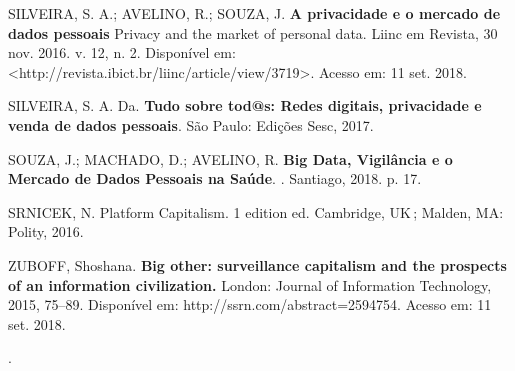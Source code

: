 SILVEIRA, S. A.; AVELINO, R.; SOUZA, J. \textbf{A privacidade e o
mercado de dados pessoais} \textbar{} Privacy and the market of personal
data. Liinc em Revista, 30 nov. 2016. v. 12, n. 2. Disponível em:
\textless{}http://revista.ibict.br/liinc/article/view/3719\textgreater{}.
Acesso em: 11 set. 2018.

SILVEIRA, S. A. Da. \textbf{Tudo sobre tod@s: Redes digitais,
privacidade e venda de dados pessoais}. São Paulo: Edições Sesc, 2017.

SOUZA, J.; MACHADO, D.; AVELINO, R. \textbf{Big Data, Vigilância e o
Mercado de Dados Pessoais na Saúde}. . Santiago, 2018. p. 17.

SRNICEK, N. Platform Capitalism. 1 edition ed. Cambridge, UK\,; Malden,
MA: Polity, 2016.

ZUBOFF, Shoshana. \textbf{Big other: surveillance capitalism and the
prospects of an information civilization.} London: Journal of
Information Technology, 2015, 75--89. Disponível em:
http://ssrn.com/abstract=2594754. Acesso em: 11 set. 2018.

.
